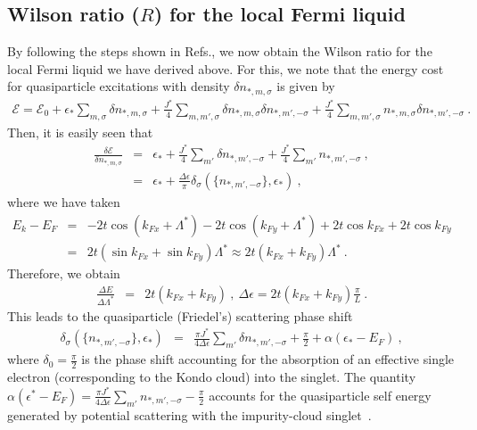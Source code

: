 \documentclass[aps,prb,preprint,groupedaddress]{revtex4-2}
\begin{document}
\subsection{Wilson ratio ($R$) for the local Fermi liquid}
By following the steps shown in Refs.\cite{nozieres1974fermi,coleman2015}, we now obtain the Wilson ratio for the local Fermi liquid we have derived above. For this, we note that the energy cost for quasiparticle excitations with density $\delta n_{*,m,\sigma}$ is given by
\begin{eqnarray}
\mathcal{E}=\mathcal{E}_{0}+\epsilon_{*}\sum_{m,\sigma}\delta n_{*,m,\sigma}+\frac{J^{*}}{4}\sum_{m,m',\sigma}\delta n_{*,m,\sigma}\delta n_{*,m',-\sigma}+\frac{J^{*}}{4}\sum_{m,m',\sigma}n_{*,m,\sigma}\delta n_{*,m',-\sigma}~.
\end{eqnarray}
Then, it is easily seen that 
\begin{eqnarray}
\frac{\delta\mathcal{E}}{\delta n_{*,m,\sigma}}&=&\epsilon_{*}+\frac{J^{*}}{4}\sum_{m'}\delta n_{*,m',-\sigma}+\frac{J^{*}}{4}\sum_{m'}n_{*,m',-\sigma}~,\nonumber\\
&=&\epsilon_{*}+\frac{\Delta\epsilon}{\pi}\delta_{\sigma}(\lbrace n_{*,m',-\sigma}\rbrace,\epsilon_{*})~,
\end{eqnarray}
where we have taken
\begin{eqnarray}
E_{k}-E_{F}&=&-2t\cos(k_{Fx}+\Lambda^{*})-2t\cos(k_{Fy}+\Lambda^{*})+2t\cos k_{Fx}+2t\cos k_{Fy}\nonumber\\
&=&2t(\sin k_{Fx}+\sin k_{Fy})\Lambda^{*}\approx 2t(k_{Fx}+k_{Fy})\Lambda^{*}~.
\end{eqnarray}
Therefore, we obtain
\begin{eqnarray}
\frac{\Delta E}{\Delta \Lambda^{*}}&=&2t(k_{Fx}+k_{Fy})~,~
\Delta \epsilon=2t(k_{Fx}+k_{Fy})\frac{\pi}{L}~.
\end{eqnarray}
This leads to the quasiparticle (Friedel's) scattering phase shift 
\begin{eqnarray}
\delta_{\sigma}(\lbrace n_{*,m',-\sigma}\rbrace,\epsilon_{*})&=&\frac{\pi J^{*}}{4\Delta\epsilon}\sum_{m'}\delta n_{*,m',-\sigma}+\frac{\pi}{2}+\alpha(\epsilon_{*}-E_{F})~,
\end{eqnarray}
where $\delta_{0}=\frac{\pi}{2}$ is the phase shift accounting for the absorption of an effective single electron (corresponding to the Kondo cloud) into the singlet. The quantity $\alpha(\epsilon^{*}-E_{F})=\frac{\pi J^{*}}{4\Delta\epsilon}\sum_{m'}n_{*,m',-\sigma}-\frac{\pi}{2}$ accounts for the quasiparticle self energy generated by potential scattering with the impurity-cloud singlet~\cite{martin-physrevlett.48.362,nozieres1974fermi,coleman2015}.
\end{document}
